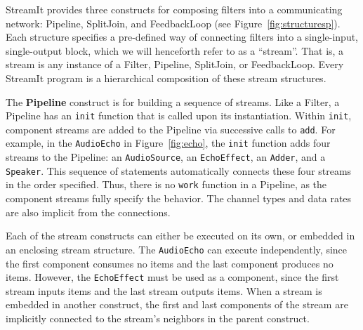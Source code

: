 StreamIt provides three constructs for composing filters into a
communicating network: Pipeline, SplitJoin, and FeedbackLoop (see
Figure~\ref{fig:structuresp}).  Each structure specifies a pre-defined
way of connecting filters into a single-input, single-output block,
which we will henceforth refer to as a ``stream''.  That is, a stream
is any instance of a Filter, Pipeline, SplitJoin, or FeedbackLoop.
Every StreamIt program is a hierarchical composition of these stream
structures.

The {\bf Pipeline} construct is for building a sequence of streams.
Like a Filter, a Pipeline has an {\tt init} function that is called upon
its instantiation.  Within {\tt init}, component streams are added to
the Pipeline via successive calls to {\tt add}.  For example, in the
{\tt AudioEcho} in Figure~\ref{fig:echo}, the {\tt init} function adds
four streams to the Pipeline: an {\tt AudioSource}, an {\tt EchoEffect},
an {\tt Adder}, and a {\tt Speaker}.  This sequence of statements
automatically connects these four streams in the order specified.  Thus,
there is no {\tt work} function in a Pipeline, as the component streams
fully specify the behavior.  The channel types and data rates are also
implicit from the connections.

Each of the stream constructs can either be executed on its own, or
embedded in an enclosing stream structure.  The {\tt AudioEcho} can
execute independently, since the first component consumes no items and
the last component produces no items.  However, the {\tt EchoEffect}
must be used as a component, since the first stream inputs items and the
last stream outputs items.  When a stream is embedded in another
construct, the first and last components of the stream are implicitly
connected to the stream's neighbors in the parent construct.


